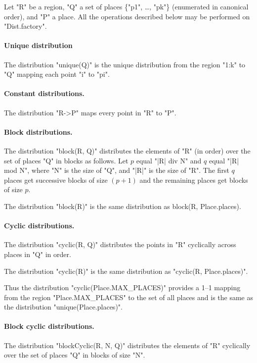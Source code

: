 Let \xcd"R" be a region, \xcd"Q" a set of places \{\xcd"p1", \dots, \xcd"pk"\}
(enumerated in canonical order), and \xcd"P" a place. All the operations
described below may be performed on \xcd"Dist.factory".

\paragraph{Unique distribution} 
The distribution \xcd"unique(Q)" is the unique distribution from the
region \xcd"1:k" to \xcd"Q" mapping each point \xcd"i" to \xcd"pi".

\paragraph{Constant distributions.} 
The distribution \xcd"R->P" maps every point in \xcd"R" to \xcd"P".

\paragraph{Block distributions.}
The distribution \xcd"block(R, Q)" distributes the elements of \xcd"R"
(in order) over the set of places \xcd"Q" in blocks  as
follows. Let $p$ equal \xcd"|R| div N" and $q$ equal \xcd"|R| mod N",
where \xcd"N" is the size of \xcd"Q", and 
\xcd"|R|" is the size of \xcd"R".  The first $q$ places get
successive blocks of size $(p+1)$ and the remaining places get blocks of
size $p$.

The distribution \xcd"block(R)" is the same distribution as {\cf
block(R, Place.places)}.

\paragraph{Cyclic distributions.} 
The distribution \xcd"cyclic(R, Q)" distributes the points in \xcd"R"
cyclically across places in \xcd"Q" in order.

The distribution \xcd"cyclic(R)" is the same distribution as \xcd"cyclic(R, Place.places)".

Thus the distribution \xcd"cyclic(Place.MAX_PLACES)" provides a 1--1
mapping from the region \xcd"Place.MAX_PLACES" to the set of all
places and is the same as the distribution \xcd"unique(Place.places)".

\paragraph{Block cyclic distributions.}
The distribution \xcd"blockCyclic(R, N, Q)" distributes the elements
of \xcd"R" cyclically over the set of places \xcd"Q" in blocks of size
\xcd"N".

